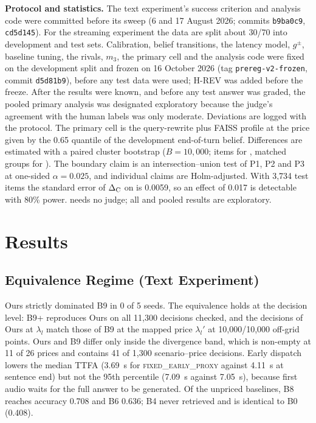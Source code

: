\textbf{Protocol and statistics.} The text experiment's success criterion and
analysis code were committed before its sweep (6 and 17 August 2026; commits
\texttt{b9ba0c9}, \texttt{cd5d145}). For the streaming experiment the data are
split about 30/70 into development and test sets. Calibration, belief
transitions, the latency model, $g^{\pm}$, baseline tuning, the rivals, $m_3$,
the primary cell and the analysis code were fixed on the development split and
frozen on 16 October 2026 (tag \texttt{prereg-v2-frozen}, commit
\texttt{d5d81b9}), before any test data were used; H-REV was added before the
freeze. After the  results were known, and before any
 test answer was graded, the pooled primary analysis was
designated exploratory because the judge's agreement with the human labels
was only moderate. Deviations are logged with the protocol. The primary cell
is the query-rewrite plus FAISS profile at the price given by the 0.65
quantile of the development end-of-turn belief. Differences are estimated with
a paired cluster bootstrap ($B=10{,}000$; items for , matched
groups for ). The boundary claim is an intersection--union
test of P1, P2 and P3 at one-sided $\alpha=0.025$, and individual claims are
Holm-adjusted. With 3,734 test items the standard error of $\Delta_{\mathrm{C}}$ on
 is 0.0059, so an effect of 0.017 is detectable with 80\%
power.  needs no judge; all  and pooled
results are exploratory.


\section{Results}\label{sec:results}

\subsection{Equivalence Regime (Text Experiment)}\label{sec:res-equiv}

Ours strictly dominated B9 in 0 of 5 seeds. The equivalence holds at the
decision level: B9+ reproduces Ours on all 11,300 decisions checked, and the
decisions of Ours at $\lambda_l$ match those of B9 at the mapped price
$\lambda_l'$ at 10,000/10,000 off-grid points. Ours and B9 differ only inside
the divergence band, which is non-empty at 11 of 26 prices and contains 41 of
1,300 scenario--price decisions. Early dispatch lowers the median TTFA
(3.69~s for \textsc{fixed\_early\_proxy} against 4.11~s at sentence end) but
not the 95th percentile (7.09~s against 7.05~s), because first audio waits for
the full answer to be generated. Of the unpriced baselines, B8 reaches
accuracy 0.708 and B6 0.636; B4 never retrieved and is identical to B0
(0.408).

